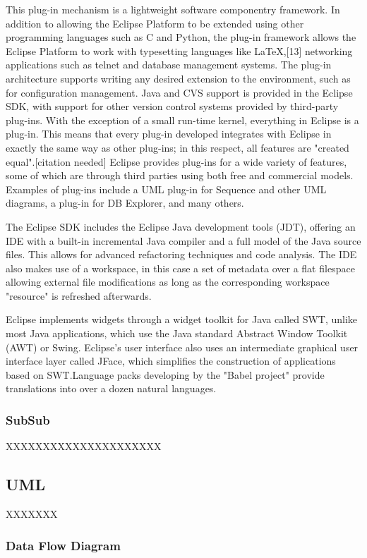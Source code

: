This plug-in mechanism is a lightweight software componentry framework. In addition to allowing the Eclipse Platform to be extended using other programming languages such as C and Python, the plug-in framework allows the Eclipse Platform to work with typesetting languages like LaTeX,[13] networking applications such as telnet and database management systems. The plug-in architecture supports writing any desired extension to the environment, such as for configuration management. Java and CVS support is provided in the Eclipse SDK, with support for other version control systems provided by third-party plug-ins.
With the exception of a small run-time kernel, everything in Eclipse is a plug-in. This means that every plug-in developed integrates with Eclipse in exactly the same way as other plug-ins; in this respect, all features are "created equal".[citation needed] Eclipse provides plug-ins for a wide variety of features, some of which are through third parties using both free and commercial models. Examples of plug-ins include a UML plug-in for Sequence and other UML diagrams, a plug-in for DB Explorer, and many others.

The Eclipse SDK includes the Eclipse Java development tools (JDT), offering an IDE with a built-in incremental Java compiler and a full model of the Java source files. This allows for advanced refactoring techniques and code analysis. The IDE also makes use of a workspace, in this case a set of metadata over a flat filespace allowing external file modifications as long as the corresponding workspace "resource" is refreshed afterwards.

Eclipse implements widgets through a widget toolkit for Java called SWT, unlike most Java applications, which use the Java standard Abstract Window Toolkit (AWT) or Swing. Eclipse's user interface also uses an intermediate graphical user interface layer called JFace, which simplifies the construction of applications based on SWT.Language packs developing by the "Babel project" provide translations into over a dozen natural languages.

\subsubsection{SubSub}
XXXXXXXXXXXXXXXXXXXXX 

\subsection{UML }
XXXXXXX
\subsubsection{Data Flow Diagram}

